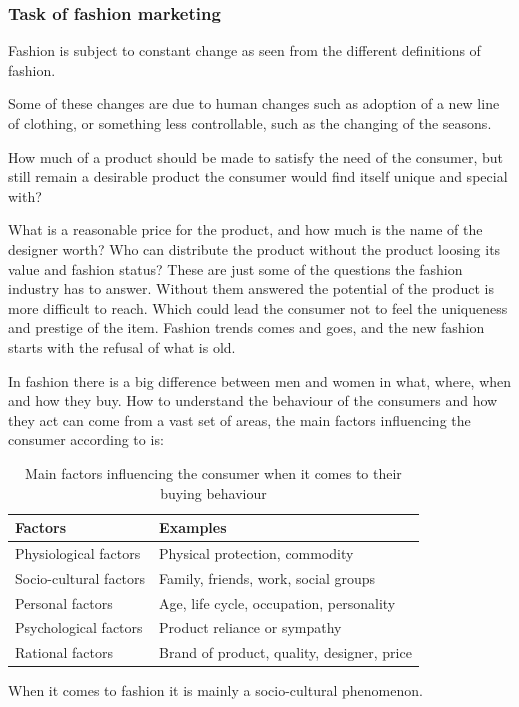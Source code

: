 \subsubsection{Task of fashion marketing}
  Fashion is subject to constant change as seen from the different definitions of
  fashion.

  Some of these changes are due to human changes such as adoption of a new line
  of clothing, or something less controllable, such as the changing of the
  seasons.

  How much of a product should be made to satisfy the need of the consumer, but
  still remain a desirable product the consumer would find itself unique and
  special with?

  What is a reasonable price for the product, and how much is the name of the
  designer worth?  Who can distribute the product without the product loosing its
  value and fashion status?  These are just some of the questions the fashion
  industry has to answer.  Without them answered the potential of the product
  is more difficult to reach.  Which could lead the consumer not to feel the uniqueness and
  prestige of the item.  Fashion trends comes and goes, and the new fashion
  starts with the refusal of what is old.

  In fashion there is a big difference between men and women in what, where, when
  and how they buy.  How to understand the behaviour of the consumers and how they
  act can come from a vast set of areas, the main factors influencing the
  consumer according to \cite{kotler2009marketing} is:

  \begin{table}[H]
      \centering
      \begin{tabular}{l l}
      \toprule
        Factors        			& Examples \\ \midrule
        Physiological factors   & Physical protection, commodity \\
        Socio-cultural factors  & Family, friends, work, social groups  \\
        Personal factors        & Age, life cycle, occupation, personality \\
        Psychological factors   & Product reliance or sympathy \\  %
        Rational factors        & Brand of product, quality, designer, price \\
      \bottomrule
      \end{tabular}
      \caption[Fashion Factors]{Main factors influencing the consumer when it comes to their buying behaviour}
      \label{table:FashionFactors}
  \end{table}
  When it comes to fashion it is mainly a socio-cultural phenomenon.

